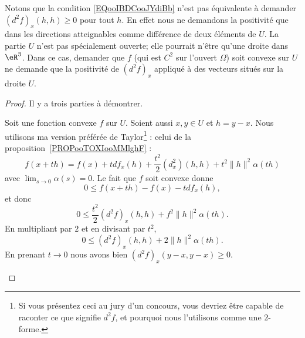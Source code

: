 \begin{remark}      \label{REMooYCRKooEQNIkC}
	Notons que la condition \eqref{EQooIBDCooJYdiBb} n'est pas équivalente à demander \( (d^2f)_x(h,h)\geq 0\) pour tout \( h\). En effet nous ne demandons la positivité que dans les directions atteignables comme différence de deux éléments de \( U\). La partie \( U\) n'est pas spécialement ouverte; elle pourrait n'être qu'une droite dans \( \eR^3\). Dans ce cas, demander que \( f\) (qui est \( C^2\) sur l'ouvert \( \Omega\)) soit convexe sur \( U\) ne demande que la positivité de \( (d^2f)_x\) appliqué à des vecteurs situés sur la droite \( U\).
\end{remark}

\begin{proof}
	Il y a trois parties à démontrer.
	\begin{subproof}

		Soit une fonction convexe \( f\) sur \( U\). Soient aussi \( x,y\in U\) et \( h=y-x\). Nous utilisons ma version préférée de Taylor\footnote{Si vous présentez ceci au jury d'un concours, vous devriez être capable de raconter ce que signifie \( d^2f\), et pourquoi nous l'utilisons comme une \( 2\)-forme.} : celui de la proposition~\ref{PROPooTOXIooMMlghF} :
		\begin{equation}
			f(x+th)=f(x)+tdf_x(h)+\frac{ t^2 }{2}(d^2_x)(h,h)+t^2\| h \|^2\alpha(th)
		\end{equation}
		avec \( \lim_{s\to 0}\alpha(s)=0\). Le fait que \( f\) soit convexe donne
		\begin{equation}
			0\leq f(x+th)-f(x)-tdf_x(h),
		\end{equation}
		et donc
		\begin{equation}
			0\leq \frac{ t^2 }{2}(d^2f)_x(h,h)+f^2\| h \|^2\alpha(th).
		\end{equation}
		En multipliant par \( 2\) et en divisant par \( t^2\),
		\begin{equation}
			0\leq (d^2f)_x(h,h)+2\| h \|^2\alpha(th).
		\end{equation}
		En prenant \( t\to 0\) nous avons bien  \( (d^2f)_x(y-x,y-x)\geq 0\).



\end{subproof}
\end{proof}
